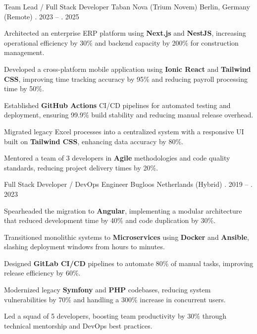 \begin{cventries}
\cventry
{Team Lead / Full Stack Developer} %
{Taban Nova (Trium Novem)} %
{Berlin, Germany (Remote)} %
{\shortmonthname[08]. 2023 -- \shortmonthname[08]. 2025} %
{
	\begin{cvitems}
		\item {Architected an enterprise ERP platform using \textbf{Next.js} and \textbf{NestJS}, increasing operational efficiency by 30\% and backend capacity by 200\% for construction management.}
		\item {Developed a cross-platform mobile application using \textbf{Ionic React} and \textbf{Tailwind CSS}, improving time tracking accuracy by 95\% and reducing payroll processing time by 50\%.}
		\item {Established \textbf{GitHub Actions} CI/CD pipelines for automated testing and deployment, ensuring 99.9\% build stability and reducing manual release overhead.}
		\item {Migrated legacy Excel processes into a centralized system with a responsive UI built on \textbf{Tailwind CSS}, enhancing data accuracy by 80\%.}
		\item {Mentored a team of 3 developers in \textbf{Agile} methodologies and code quality standards, reducing project delivery times by 20\%.}
	\end{cvitems}
}

\cventry
{Full Stack Developer / DevOps Engineer} %
{Bugloos} %
{Netherlands (Hybrid)} %
{\shortmonthname[08]. 2019 -- \shortmonthname[08]. 2023} %
{
	\begin{cvitems}
		\item {Spearheaded the migration to \textbf{Angular}, implementing a modular architecture that reduced development time by 40\% and code duplication by 30\%.}
		\item {Transitioned monolithic systems to \textbf{Microservices} using \textbf{Docker} and \textbf{Ansible}, slashing deployment windows from hours to minutes.}
		\item {Designed \textbf{GitLab CI/CD} pipelines to automate 80\% of manual tasks, improving release efficiency by 60\%.}
		\item {Modernized legacy \textbf{Symfony} and \textbf{PHP} codebases, reducing system vulnerabilities by 70\% and handling a 300\% increase in concurrent users.}
		\item {Led a squad of 5 developers, boosting team productivity by 30\% through technical mentorship and DevOps best practices.}
	\end{cvitems}
}


\end{cventries}

